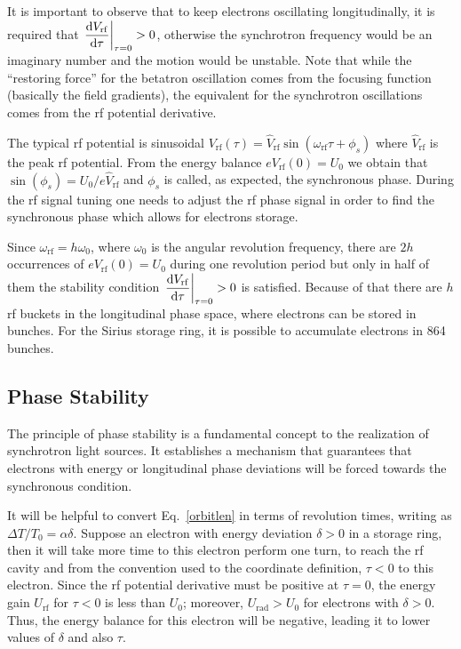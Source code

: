 It is important to observe that to keep electrons oscillating longitudinally, it is required that $\left.\dfrac{\mathrm{d} V_{\mathrm{rf}}}{\mathrm{d} \tau}\right|_{\tau = 0} > 0$, otherwise the synchrotron frequency would be an imaginary number and the motion would be unstable. Note that while the ``restoring force'' for the betatron oscillation comes from the focusing function (basically the field gradients), the equivalent for the synchrotron oscillations comes from the \gls{rf} potential derivative.

The typical \gls{rf} potential is sinusoidal $V_{\mathrm{rf}}(\tau) = \hat{V}_{\mathrm{rf}} \sin \left(\omega_{\mathrm{rf}}\tau + \phi_s\right)$ where $\hat{V}_{\mathrm{rf}}$ is the peak \gls{rf} potential. From the energy balance $eV_{\mathrm{rf}}(0) = U_0$ we obtain that $\sin(\phi_s) = U_0/e\hat{V}_{\mathrm{rf}}$ and $\phi_s$ is called, as expected, the synchronous phase. During the \gls{rf} signal tuning one needs to adjust the \gls{rf} phase signal in order to find the synchronous phase which allows for electrons storage.

Since $\omega_{\mathrm{rf}} = h \omega_0$, where $\omega_0$ is the angular revolution frequency, there are $2h$ occurrences of $eV_{\mathrm{rf}}(0) = U_0$ during one revolution period but only in half of them the stability condition $\left.\dfrac{\mathrm{d} V_{\mathrm{rf}}}{\mathrm{d} \tau}\right|_{\tau = 0} > 0$ is satisfied. Because of that there are $h$ \gls{rf} buckets in the longitudinal phase space, where electrons can be stored in bunches. For the Sirius storage ring, it is possible to accumulate electrons in 864 bunches.
\subsection{Phase Stability}
The principle of phase stability is a fundamental concept to the realization of synchrotron light sources. It establishes a mechanism that guarantees that electrons with energy or longitudinal phase deviations will be forced towards the synchronous condition.

It will be helpful to convert Eq.~\eqref{orbitlen} in terms of revolution times, writing as $\Delta T/T_0 = \alpha \delta$. Suppose an electron with energy deviation $\delta > 0$ in a storage ring, then it will take more time to this electron perform one turn, to reach the \gls{rf} cavity and from the convention used to the coordinate definition, $\tau < 0$ to this electron. Since the \gls{rf} potential derivative must be positive at $\tau = 0$, the energy gain $U_{\mathrm{rf}}$ for $\tau < 0$ is less than $U_0$; moreover, $U_{\mathrm{rad}} > U_0$ for electrons with $\delta > 0$. Thus, the energy balance for this electron will be negative, leading it to lower values of $\delta$ and also $\tau$.

